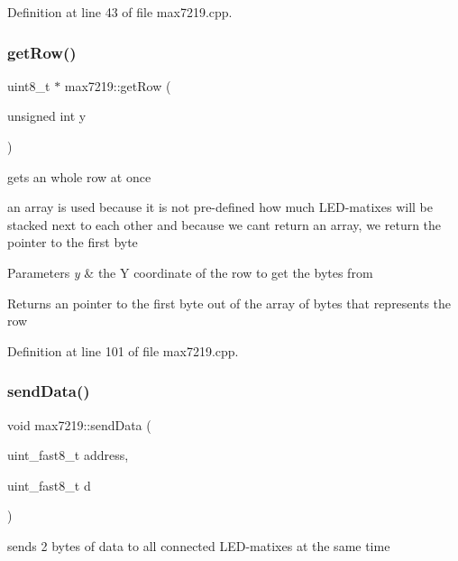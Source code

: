 Definition at line 43 of file max7219.\+cpp.

\mbox{\label{classmax7219_a0f9339f854dea8c0499dbfc4785fc9e2}} 
\subsubsection{\texorpdfstring{get\+Row()}{getRow()}}
{\footnotesize\ttfamily uint8\+\_\+t $\ast$ max7219\+::get\+Row (\begin{DoxyParamCaption}\item[{unsigned int}]{y }\end{DoxyParamCaption})}



gets an whole row at once 

an array is used because it is not pre-\/defined how much L\+E\+D-\/matixes will be stacked next to each other and because we can\textquotesingle{}t return an array, we return the pointer to the first byte 
\begin{DoxyParams}{Parameters}
{\em y} & the Y coordinate of the row to get the bytes from \\
\hline
\end{DoxyParams}
\begin{DoxyReturn}{Returns}
an pointer to the first byte out of the array of bytes that represents the row 
\end{DoxyReturn}


Definition at line 101 of file max7219.\+cpp.

\mbox{\label{classmax7219_ab63d56bdc1aa6f1fd2dd4290737d3303}} 
\subsubsection{\texorpdfstring{send\+Data()}{sendData()}}
{\footnotesize\ttfamily void max7219\+::send\+Data (\begin{DoxyParamCaption}\item[{uint\+\_\+fast8\+\_\+t}]{address,  }\item[{uint\+\_\+fast8\+\_\+t}]{d }\end{DoxyParamCaption})}



sends 2 bytes of data to all connected L\+E\+D-\/matixes at the same time 


